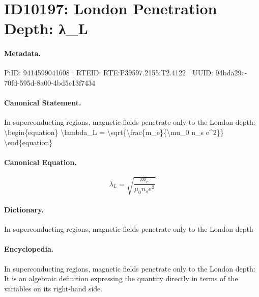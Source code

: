 \section*{ID10197: London Penetration Depth: λ\_L}
\paragraph{Metadata.}
PiID: 9414599041608 | RTEID: RTE:P39597.2155:T2.4122 | UUID: 94bda29c-70fd-595d-8a00-4bd5c13f7434

\paragraph{Canonical Statement.}
In superconducting regions, magnetic fields penetrate only to the London depth: \textbackslash{}begin\{equation\} \textbackslash{}lambda\_L = \textbackslash{}sqrt\{\textbackslash{}frac\{m\_e\}\{\textbackslash{}mu\_0 n\_s e\textasciicircum{}2\}\} \textbackslash{}end\{equation\}

\paragraph{Canonical Equation.}
\[
\lambda_L = \sqrt{\frac{m_e}{\mu_0 n_s e^2}}
\]

\paragraph{Dictionary.}
In superconducting regions, magnetic fields penetrate only to the London depth

\paragraph{Encyclopedia.}
In superconducting regions, magnetic fields penetrate only to the London depth: It is an algebraic definition expressing the quantity directly in terms of the variables on its right-hand side.
